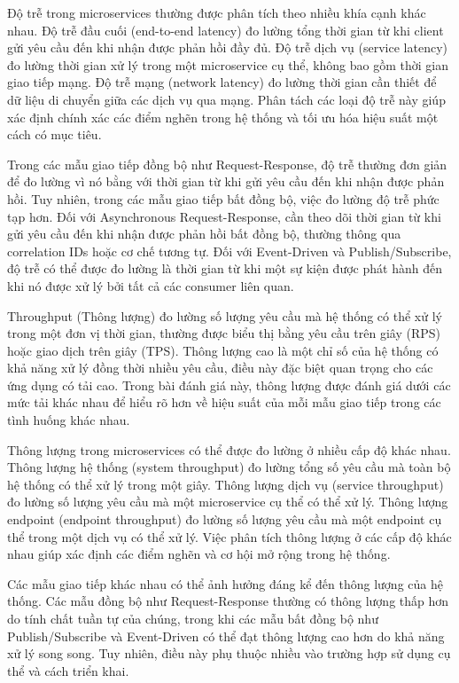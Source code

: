 Độ trễ trong microservices thường được phân tích theo nhiều khía cạnh khác nhau. Độ trễ đầu cuối (end-to-end latency) đo lường tổng thời gian từ khi client gửi yêu cầu đến khi nhận được phản hồi đầy đủ. Độ trễ dịch vụ (service latency) đo lường thời gian xử lý trong một microservice cụ thể, không bao gồm thời gian giao tiếp mạng. Độ trễ mạng (network latency) đo lường thời gian cần thiết để dữ liệu di chuyển giữa các dịch vụ qua mạng. Phân tách các loại độ trễ này giúp xác định chính xác các điểm nghẽn trong hệ thống và tối ưu hóa hiệu suất một cách có mục tiêu.

Trong các mẫu giao tiếp đồng bộ như Request-Response, độ trễ thường đơn giản để đo lường vì nó bằng với thời gian từ khi gửi yêu cầu đến khi nhận được phản hồi. Tuy nhiên, trong các mẫu giao tiếp bất đồng bộ, việc đo lường độ trễ phức tạp hơn. Đối với Asynchronous Request-Response, cần theo dõi thời gian từ khi gửi yêu cầu đến khi nhận được phản hồi bất đồng bộ, thường thông qua correlation IDs hoặc cơ chế tương tự. Đối với Event-Driven và Publish/Subscribe, độ trễ có thể được đo lường là thời gian từ khi một sự kiện được phát hành đến khi nó được xử lý bởi tất cả các consumer liên quan.

Throughput (Thông lượng) đo lường số lượng yêu cầu mà hệ thống có thể xử lý trong một đơn vị thời gian, thường được biểu thị bằng yêu cầu trên giây (RPS) hoặc giao dịch trên giây (TPS). Thông lượng cao là một chỉ số của hệ thống có khả năng xử lý đồng thời nhiều yêu cầu, điều này đặc biệt quan trọng cho các ứng dụng có tải cao. Trong bài đánh giá này, thông lượng được đánh giá dưới các mức tải khác nhau để hiểu rõ hơn về hiệu suất của mỗi mẫu giao tiếp trong các tình huống khác nhau.

Thông lượng trong microservices có thể được đo lường ở nhiều cấp độ khác nhau. Thông lượng hệ thống (system throughput) đo lường tổng số yêu cầu mà toàn bộ hệ thống có thể xử lý trong một giây. Thông lượng dịch vụ (service throughput) đo lường số lượng yêu cầu mà một microservice cụ thể có thể xử lý. Thông lượng endpoint (endpoint throughput) đo lường số lượng yêu cầu mà một endpoint cụ thể trong một dịch vụ có thể xử lý. Việc phân tích thông lượng ở các cấp độ khác nhau giúp xác định các điểm nghẽn và cơ hội mở rộng trong hệ thống.

Các mẫu giao tiếp khác nhau có thể ảnh hưởng đáng kể đến thông lượng của hệ thống. Các mẫu đồng bộ như Request-Response thường có thông lượng thấp hơn do tính chất tuần tự của chúng, trong khi các mẫu bất đồng bộ như Publish/Subscribe và Event-Driven có thể đạt thông lượng cao hơn do khả năng xử lý song song. Tuy nhiên, điều này phụ thuộc nhiều vào trường hợp sử dụng cụ thể và cách triển khai.

